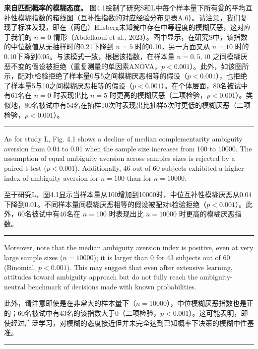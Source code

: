 \documentclass[12pt,a4paper]{article}
\newenvironment{original}
  {\par\vspace{0.5em}\noindent\color{black}\ignorespaces}
  {\par\vspace{0.3em}}
\newenvironment{translation}
  {\par\noindent\color{transblue}\ignorespaces}
  {\par\vspace{0.8em}\hrule\vspace{0.5em}}
\begin{document}
\begin{translation}
\textbf{来自匹配概率的模糊态度。} 图4.1绘制了研究S和L中每个样本量下所有瓮的平均互补性模糊指数的箱线图（互补性指数的对应经验分布见表A.6）。请注意，我们复现了标准发现，即在（两色）Ellsberg未知瓮中存在中等程度的模糊厌恶，这对应于我们的 $n = 0$ 情形（Abdellaoui et al., 2023）。图中显示，在研究S中，该指数的中位数值从无抽样时的0.21下降到 $n = 5$ 时的0.10，另一方面又从 $n = 10$ 时的0.10下降到0.05。与该模式一致，根据该指数，在样本量 $n = 0, 5, 10$ 之间模糊厌恶不变的假设被拒绝（重复测量的单因素ANOVA，$p < 0.001$）。此外，如该图所示，配对t检验拒绝了样本量0与5之间模糊厌恶相等的假设（$p < 0.001$），也拒绝了样本量5与10之间模糊厌恶相等的假设（$p < 0.001$）。在个体层面，80名被试中有61名在 $n = 0$ 时表现出比 $n = 5$ 时更高的模糊厌恶（二项检验，$p < 0.001$）。类似地，80名被试中有54名在抽样10次时表现出比抽样5次时更低的模糊厌恶（二项检验，$p < 0.001$）。
\end{translation}

\begin{original}
As for study L, Fig. 4.1 shows a decline of median complementarity ambiguity aversion from 0.04 to 0.01 when the sample size increases from 100 to 10000. The assumption of equal ambiguity aversion across samples sizes is rejected by a paired t-test ($p < 0.001$). Additionally, 46 out of 60 subjects exhibited a higher index of ambiguity aversion for $n = 100$ than for $n = 10000$.
\end{original}

\begin{translation}
至于研究L，图4.1显示当样本量从100增加到10000时，中位互补性模糊厌恶从0.04下降到0.01。不同样本量间模糊厌恶相等的假设被配对t检验拒绝（$p < 0.001$）。此外，60名被试中有46名在 $n = 100$ 时表现出比 $n = 10000$ 时更高的模糊厌恶指数。
\end{translation}

\begin{original}
Moreover, note that the median ambiguity aversion index is positive, even at very large sample sizes ($n = 10000$); it is larger than 0 for 43 subjects out of 60 (Binomial, $p < 0.001$). This may suggest that even after extensive learning, attitudes toward ambiguity approach but do not fully reach the ambiguity-neutral benchmark of decisions made with known probabilities.
\end{original}

\begin{translation}
此外，请注意即使是在非常大的样本量下（$n = 10000$），中位模糊厌恶指数也是正的；60名被试中有43名的该指数大于0（二项检验，$p < 0.001$）。这可能表明，即使经过广泛学习，对模糊的态度接近但并未完全达到已知概率下决策的模糊中性基准。
\end{translation}
\end{document}

